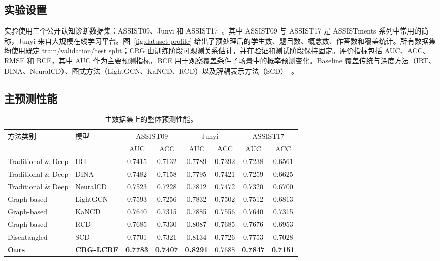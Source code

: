 \documentclass[conference]{IEEEtran}
\begin{document}
\subsection{实验设置}
实验使用三个公开认知诊断数据集：ASSIST09、Junyi 和 ASSIST17~\cite{assistments2009,heffernan2017assistments,assistments2017,choi2020ednet}。其中 ASSIST09 与 ASSIST17 是 ASSISTments 系列中常用的简称，Junyi 来自大规模在线学习平台。图~\ref{fig:dataset-profile} 给出了预处理后的学生数、题目数、概念数、作答数和覆盖统计。所有数据集均使用既定 train/validation/test split；CRG 由训练阶段可观测关系估计，并在验证和测试阶段保持固定。评价指标包括 AUC、ACC、RMSE 和 BCE，其中 AUC 作为主要预测指标，BCE 用于观察覆盖条件子场景中的概率预测变化。Baseline 覆盖传统与深度方法（IRT、DINA、NeuralCD）、图式方法（LightGCN、KaNCD、RCD）以及解耦表示方法（SCD）~\cite{lord1980irt,delatorre2009dina,wang2020ncdm,he2020lightgcn,wang2022kscd,gao2021rcd,wang2023scd}。

\subsection{主预测性能}
\begin{table}[!t]
\centering
\caption{主数据集上的整体预测性能。}
\label{tab:main-performance}
\small
\setlength{\tabcolsep}{5pt}
\begin{tabular}{llcccccc}
\toprule
\multirow{2}{*}{方法类别} & \multirow{2}{*}{模型} &
\multicolumn{2}{c}{ASSIST09} & \multicolumn{2}{c}{Junyi} & \multicolumn{2}{c}{ASSIST17}\\
\cmidrule(lr){3-4}\cmidrule(lr){5-6}\cmidrule(lr){7-8}
& & AUC & ACC & AUC & ACC & AUC & ACC\\
\midrule
Traditional \& Deep & IRT & 0.7415 & 0.7132 & 0.7789 & 0.7392 & 0.7238 & 0.6561\\
Traditional \& Deep & DINA & 0.7482 & 0.7158 & 0.7795 & 0.7421 & 0.7259 & 0.6625\\
Traditional \& Deep & NeuralCD & 0.7523 & 0.7228 & 0.7812 & 0.7472 & 0.7320 & 0.6700\\
Graph-based & LightGCN & 0.7593 & 0.7256 & 0.7832 & 0.7502 & 0.7512 & 0.6813\\
Graph-based & KaNCD & 0.7640 & 0.7315 & 0.7885 & 0.7556 & 0.7640 & 0.7315\\
Graph-based & RCD & 0.7685 & 0.7330 & 0.8087 & 0.7685 & 0.7676 & 0.6953\\
Disentangled & SCD & 0.7701 & 0.7321 & 0.8134 & 0.7726 & 0.7753 & 0.7028\\
\textbf{Ours} & \textbf{CRG-LCRF} & \textbf{0.7783} & \textbf{0.7407} & \textbf{0.8291} & 0.7688 & \textbf{0.7847} & \textbf{0.7151}\\
\bottomrule
\end{tabular}
\end{table}
\end{document}
